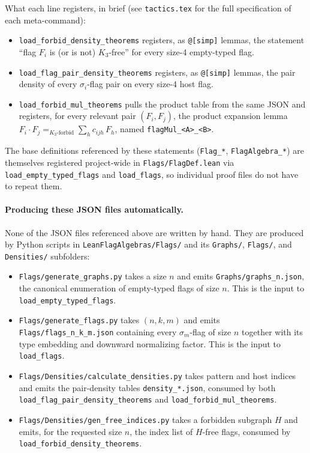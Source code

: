 \documentclass[11pt]{article}
\begin{document}
What each line registers, in brief (see \texttt{tactics.tex} for the
full specification of each meta-command):

\begin{itemize}
  \item \texttt{load\_forbid\_density\_theorems} registers, as
    \texttt{@[simp]} lemmas, the statement ``flag $F_i$ is (or is not)
    $K_3$-free'' for every size-4 empty-typed flag.
  \item \texttt{load\_flag\_pair\_density\_theorems} registers, as
    \texttt{@[simp]} lemmas, the pair density of every $\sigma_i$-flag pair
    on every size-4 host flag.
  \item \texttt{load\_forbid\_mul\_theorems} pulls the product table from
    the same JSON and registers, for every relevant pair $(F_i, F_j)$, the
    product expansion lemma
    $F_i \cdot F_j =_{K_3\text{-forbid}}
       \sum_h c_{ijh}\, F_h$, named \texttt{flagMul\_<A>\_<B>}.
\end{itemize}

The base definitions referenced by these statements (\texttt{Flag\_*},
\texttt{FlagAlgebra\_*}) are themselves registered project-wide in
\texttt{Flags/FlagDef.lean} via \texttt{load\_empty\_typed\_flags} and
\texttt{load\_flags}, so individual proof files do not have to repeat them.

\paragraph{Producing these JSON files automatically.}
None of the JSON files referenced above are written by hand. They are
produced by Python scripts in \texttt{LeanFlagAlgebras/Flags/} and its
\texttt{Graphs/}, \texttt{Flags/}, and \texttt{Densities/} subfolders:

\begin{itemize}
  \item \texttt{Flags/generate\_graphs.py} takes a size $n$ and emits
    \texttt{Graphs/graphs\_n.json}, the canonical enumeration of
    empty-typed flags of size $n$. This is the input to
    \texttt{load\_empty\_typed\_flags}.
  \item \texttt{Flags/generate\_flags.py} takes $(n, k, m)$ and emits
    \texttt{Flags/flags\_n\_k\_m.json} containing every $\sigma_m$-flag of
    size $n$ together with its type embedding and downward normalizing
    factor. This is the input to \texttt{load\_flags}.
  \item \texttt{Flags/Densities/calculate\_densities.py} takes pattern and
    host indices and emits the pair-density tables
    \texttt{density\_*.json}, consumed by both
    \texttt{load\_flag\_pair\_density\_theorems} and
    \texttt{load\_forbid\_mul\_theorems}.
  \item \texttt{Flags/Densities/gen\_free\_indices.py} takes a forbidden
    subgraph $H$ and emits, for the requested size $n$, the index list of
    $H$-free flags, consumed by
    \texttt{load\_forbid\_density\_theorems}.
\end{itemize}
\end{document}

